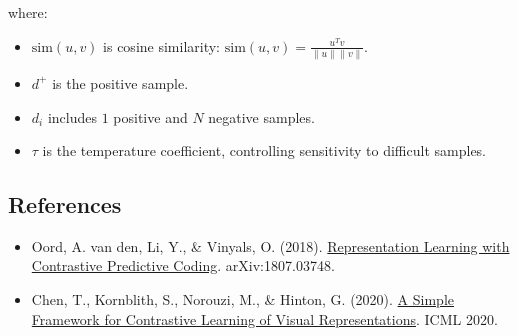 where:

\begin{itemize}
\tightlist
\item
  \(\mathrm{sim}(u,v)\) is cosine similarity: \(\mathrm{sim}(u,v)=\frac{u^Tv}{\lVert u\rVert\lVert v\rVert}\).
\item
  \(d^+\) is the positive sample.
\item
  \(d_i\) includes \(1\) positive and \(N\) negative samples.
\item
  \(\tau\) is the temperature coefficient, controlling sensitivity to difficult samples.
\end{itemize}

\FloatBarrier
{}
\hypertarget{references-32}{%
\subsection{References}\label{references-32}}

\vspace{0.25em}
\begin{itemize}
\tightlist
\item
  Oord, A. van den, Li, Y., \& Vinyals, O. (2018). \href{https://arxiv.org/abs/1807.03748}{Representation Learning with Contrastive Predictive Coding}. arXiv:1807.03748.
\item
  Chen, T., Kornblith, S., Norouzi, M., \& Hinton, G. (2020). \href{https://proceedings.mlr.press/v119/chen20j.html}{A Simple Framework for Contrastive Learning of Visual Representations}. ICML 2020.
\end{itemize}

\clearpage
